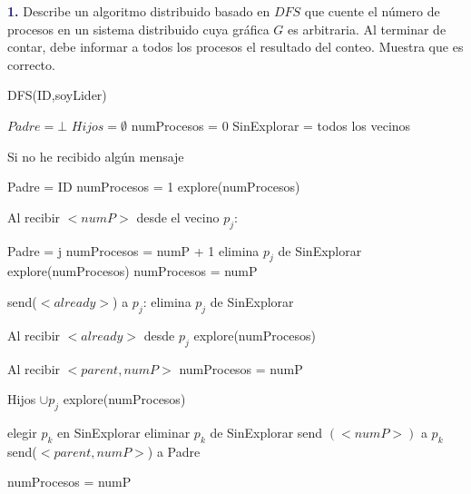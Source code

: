 \newpage
\textbf{\textcolor{MidnightBlue}{1.}}
Describe un algoritmo distribuido basado en $DFS$ que cuente el número de procesos
en un sistema distribuido cuya gráfica $G$ es arbitraria. Al terminar de contar, debe informar a todos
los procesos el resultado del conteo. Muestra que es correcto.


\begin{algorithm}
\caption{DFS(ID,soyLider)}
\begin{algorithmic}[1]
\State $Padre = \bot$
\State $Hijos = \emptyset$
\State numProcesos = 0
\State SinExplorar = todos los vecinos

\State Si no he recibido algún mensaje

    \State Padre = ID
    \State numProcesos = 1
    \State explore(numProcesos)
\EndIf

\State Al recibir $<numP>$ desde el vecino $p_j$:

    \State Padre = j
    \State numProcesos = numP + 1 
    \State elimina $p_j$ de SinExplorar
    \State explore(numProcesos)
\Else
        \State numProcesos = numP
    \EndIf

    \State send($<already>$) a $p_j$:
    \State elimina $p_j$ de SinExplorar
\EndIf

\State Al recibir $<already>$ desde $p_j$
    \State explore(numProcesos)

\State Al recibir $<parent,numP>$
        \State numProcesos = numP
    \EndIf

    \State Hijos $\cup {p_j}$
    \State explore(numProcesos)


        \State elegir $p_k$ en SinExplorar
        \State eliminar $p_k$ de SinExplorar
        \State send $(<numP>)$ a $p_k$
    \Else
            \State send($<parent, numP>$) a Padre
        \EndIf
        
            \State numProcesos = numP
        \EndIf
    \EndIf
\EndProcedure
\end{algorithmic}
\end{algorithm}
